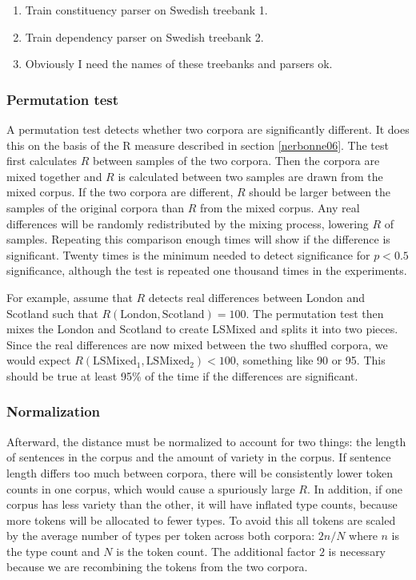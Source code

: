 \documentclass[11pt]{article}
\begin{document}
\begin{enumerate}
\item Train constituency parser on Swedish treebank 1.
\item Train dependency parser on Swedish treebank 2.
\item Obviously I need the names of these treebanks and parsers ok.
\end{enumerate}

\subsubsection{Permutation test}
\label{permutationtest}

A permutation test detects whether two corpora are significantly
different. It does this on the basis of the R measure described in
section \ref{nerbonne06}. The test first calculates $R$ between
samples of the two corpora. Then the corpora are mixed together and
$R$ is calculated between two samples are drawn from the mixed
corpus. If the two corpora are different, $R$ should be larger between
the samples of the original corpora than $R$ from the mixed
corpus. Any real differences will be randomly redistributed by the
mixing process, lowering $R$ of samples. Repeating this comparison
enough times will show if the difference is significant. Twenty times
is the minimum needed to detect significance for $p < 0.5$
significance, although the test is repeated one thousand times in the
experiments.

For example, assume that $R$ detects real differences between London
and Scotland such that $R(\textrm{London},\textrm{Scotland}) =
100$. The permutation test then mixes the London and Scotland to
create LSMixed and splits it into two pieces. Since the real
differences are now mixed between the two shuffled corpora, we
would expect $R(\textrm{LSMixed}_1, \textrm{LSMixed}_2) < 100$, something
like 90 or 95. This should be true at least 95\% of the time if the
differences are significant.

\subsubsection{Normalization}
Afterward, the distance must be normalized to account for two things:
the length of sentences in the corpus and the amount of variety in the
corpus. If sentence length differs too much between corpora, there
will be consistently lower token counts in one corpus, which would
cause a spuriously large $R$. In addition, if one corpus has less
variety than the other, it will have inflated type counts, because
more tokens will be allocated to fewer types. To avoid
this all tokens are scaled by the average number of types per token
across both corpora: $2n/N$ where $n$ is the type count and $N$ is
the token count. The additional factor $2$ is necessary because we are
recombining the tokens from the two corpora.
\end{document}
